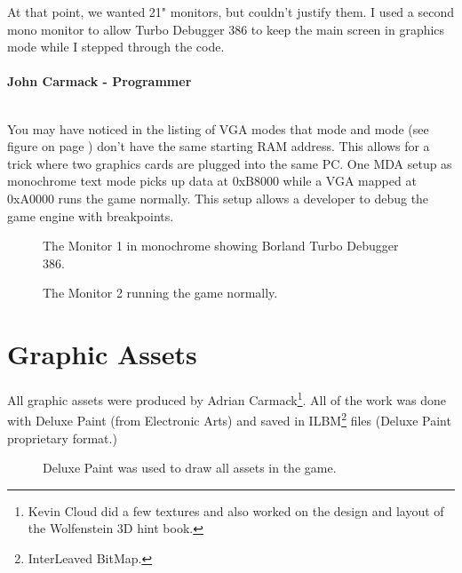 \documentclass[book.tex]{subfiles}
\begin{document}
\begin{fancyquotes}
At that point, we wanted 21" monitors, but couldn't justify them.  I used a second mono monitor to allow Turbo Debugger 386 to keep the main screen in graphics mode while I stepped through the code.\\
 \\
\textbf{John Carmack - Programmer}
\end{fancyquotes}
\\
You may have noticed in the listing of VGA modes that mode  and mode  (see figure on page \pageref{fig:vga_modes})  don't have the same starting RAM address. This allows for a trick where two graphics cards are plugged into the same PC. One MDA setup as monochrome text mode picks up data at 0xB8000 while a VGA mapped at 0xA0000 runs the game normally. This setup allows a developer to debug the game engine with breakpoints.
\begin{figure}[H]
  \centering
      \caption{The Monitor 1 in monochrome showing Borland Turbo Debugger 386.}
\end{figure}



\begin{figure}[H]
  \centering
    \caption{The Monitor 2 running the game normally.}
\end{figure}



 
 
 




\section{Graphic Assets}

All graphic assets were produced by Adrian Carmack\footnote{Kevin Cloud did a few textures and also worked on the design and layout of the Wolfenstein 3D hint book.}. All of the work was done with Deluxe Paint (from Electronic Arts) and saved in ILBM\footnote{InterLeaved BitMap.} files (Deluxe Paint proprietary format.) 

\begin{figure}[H]
  \centering
 \caption{Deluxe Paint was used to draw all assets in the game.}
\end{figure}
\end{document}
